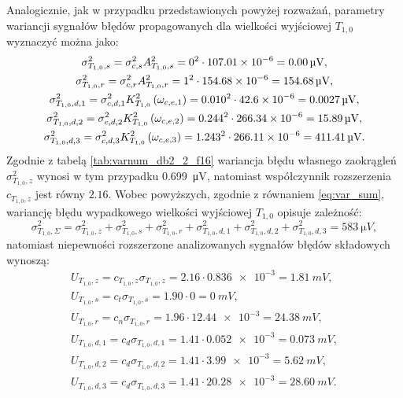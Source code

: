 Analogicznie, jak w przypadku przedstawionych powyżej rozważań, parametry wariancji sygnałów błędów propagowanych dla wielkości wyjściowej $T_{1,0}$ wyznaczyć można jako:
\begin{gather}
\sigma_{T_{1,0},s}^{2} = \sigma_{c,s}^{2} A_{T_{1,0},s}^{2} = 0^{2} \cdot \num{107.01e-6} = \qty{0.00}{\micro V} \label{eq:sym_partd_output_var_stat_T_1_0}, \\
\sigma_{T_{1,0},r}^{2} = \sigma_{c,r}^{2} A_{T_{1,0},r}^{2} = 1^{2} \cdot \num{154.68e-6} = \qty{154.68}{\micro V} \label{eq:sym_partd_output_var_rand_T_1_0}, \\
\sigma_{T_{1,0},d,1}^{2} = \sigma_{c,d,1}^{2} K_{T_{1,0}}^{2} \left(\omega_{c,e,1}\right) = {0.010}^{2} \cdot \num{42.6e-6} = \qty{0.0027}{\micro V} \label{eq:sym_partd_output_var_dyn_1_T_1_0}, \\
\sigma_{T_{1,0},d,2}^{2} = \sigma_{c,d,2}^{2} K_{T_{1,0}}^{2}\left(\omega_{c,e,2}\right) = {0.244}^{2} \cdot \num{266.34e-6} = \qty{15.89}{\micro V} \label{eq:sym_partd_output_var_dyn_2_T_1_0}, \\
\sigma_{T_{1,0},d,3}^{2} = \sigma_{c,d,3}^{2} K_{T_{1,0}}^{2} \left(\omega_{c,e,3}\right) = {1.243}^{2} \cdot \num{266.11e-6} = \qty{411.41}{\micro V} \label{eq:sym_partd_output_var_dyn_3_T_1_0}.
\end{gather}
Zgodnie z tabelą \ref{tab:varnum_db2_2_f16} wariancja błędu własnego zaokrągleń $\sigma_{T_{1,0},z}^{2}$ wynosi w tym przypadku \qty{0.699}{\micro V}, natomiast współczynnik rozszerzenia $c_{T_{1,0},z}$ jest równy $2.16$. Wobec powyższych, zgodnie z równaniem \eqref{eq:var_sum}, wariancję błędu wypadkowego wielkości wyjściowej $T_{1,0}$ opisuje zależność:
\begin{equation}
\sigma_{T_{1,0},\Sigma}^{2} = \sigma_{T_{1,0},z}^{2} + \sigma_{T_{1,0},s}^{2} + \sigma_{T_{1,0},r}^{2} + \sigma_{T_{1,0},d,1}^{2} + \sigma_{T_{1,0},d,2}^{2} + \sigma_{T_{1,0},d,3}^{2} = \qty{583}{\micro V} \label{eq:sym_partd_output_var_sum_T_1_0},
\end{equation}
natomiast niepewności rozszerzone analizowanych sygnałów błędów składowych wynoszą:
\begin{gather}
U_{T_{1,0},z} = c_{T_{1,0},z} \sigma_{T_{1,0},z} = 2.16 \cdot \num{0.836e-3} = \qty{1.81}{mV} \label{eq:sym_partd_output_unc_roun_T_1_0},\\
U_{T_{1,0},s} = c_{t} \sigma_{T_{1,0},s} = 1.90 \cdot \num{0} = \qty{0}{mV} \label{eq:sym_partd_output_unc_stat_T_1_0}, \\
U_{T_{1,0},r} = c_{n} \sigma_{T_{1,0},r} = 1.96 \cdot \num{12.44e-3} = \qty{24.38}{mV} \label{eq:sym_partd_output_unc_rand_T_1_0}, \\
U_{T_{1,0},d,1} = c_{d} \sigma_{T_{1,0},d,1} = 1.41 \cdot \num{0.052e-3} = \qty{0.073}{mV} \label{eq:sym_partd_output_unc_dyn_1_T_1_0}, \\
U_{T_{1,0},d,2} = c_{d} \sigma_{T_{1,0},d,2} = 1.41 \cdot \num{3.99e-3} = \qty{5.62}{mV} \label{eq:sym_partd_output_unc_dyn_2_T_1_0}, \\
U_{T_{1,0},d,3} = c_{d} \sigma_{T_{1,0},d,3} = 1.41 \cdot \num{20.28e-3} = \qty{28.60}{mV} \label{eq:sym_partd_output_unc_dyn_3_T_1_0}.
\end{gather}

